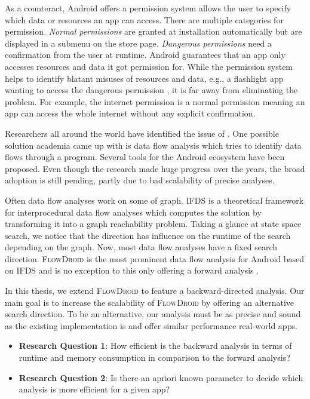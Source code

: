 \documentclass[../draft.tex]{subfiles}
\begin{document}
    As a counteract, Android offers a permission system allows the user to specify which data or resources an app can access. 
    There are multiple categories for permission.
    \textit{Normal permissions} are granted at installation automatically but are displayed in a submenu on the store page. 
    \textit{Dangerous permissions} need a confirmation from the user at runtime.
    Android guarantees that an app only accesses resources and data it got permission for. 
    While the permission system helps to identify blatant misuses of resources and data, e.g., a flashlight app wanting to access the dangerous permission , it is far away from eliminating the problem.
    For example, the internet permission is a normal permission meaning an app can access the whole internet without any explicit confirmation.

    Researchers all around the world have identified the issue of .
    One possible solution academia came up with is data flow analysis which tries to identify data flows through a program.
    Several tools for the Android ecosystem have been proposed. 
    Even though the research made huge progress over the years, the broad adoption is still pending, partly due to bad scalability of precise analyses.

    Often data flow analyses work on some of graph.
    IFDS is a theoretical framework for interprocedural data flow analyses which computes the solution by transforming it into a graph reachability problem.
    Taking a glance at state space search, we notice that the direction has influence on the runtime of the search depending on the graph. 
    Now, most data flow analyses have a fixed search direction.
    \textsc{FlowDroid} is the most prominent data flow analysis for Android based on IFDS and is no exception to this only offering a forward analysis \cite{Arzt2014}.

    In this thesis, we extend \textsc{FlowDroid} to feature a backward-directed analysis.
    Our main goal is to increase the scalability of \textsc{FlowDroid} by offering an alternative search direction.
    To be an alternative, our analysis must be as precise and sound as the existing implementation is and offer similar performance real-world apps.

    \begin{itemize}
        \item \textbf{Research Question 1}: How efficient is the backward analysis in terms of runtime and memory consumption in comparison to the forward analysis?
        \item \textbf{Research Question 2}: Is there an apriori known parameter to decide which analysis is more efficient for a given app? 
    \end{itemize}
\end{document}
